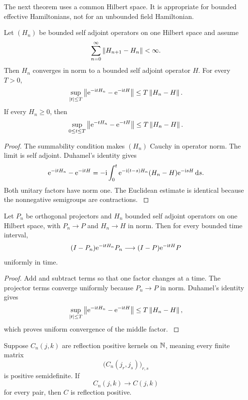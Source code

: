 The next theorem uses a common Hilbert space. It is appropriate for bounded effective Hamiltonians, not for an unbounded field Hamiltonian.

\begin{theorem}\label{strong:theorem:047}\label{strong:thm:norm_summable_tower}
Let \((H_n)\) be bounded self adjoint operators on one Hilbert space and assume
\[
\sum_{n=0}^{\infty}\left\lVert H_{n+1}-H_n\right\rVert<\infty.
\]
Then \(H_n\) converges in norm to a bounded self adjoint operator \(H\). For every \(T>0\),
\[
\sup_{\left\lvert t\right\rvert\leq T}
\left\lVert\mathrm e^{-\mathrm i tH_n}-\mathrm e^{-\mathrm i tH}\right\rVert
\leq
T\left\lVert H_n-H\right\rVert.
\]
If every \(H_n\geq0\), then
\[
\sup_{0\leq t\leq T}
\left\lVert\mathrm e^{-tH_n}-\mathrm e^{-tH}\right\rVert
\leq
T\left\lVert H_n-H\right\rVert.
\]
\end{theorem}

\begin{proof}\label{strong:proof:075}
The summability condition makes \((H_n)\) Cauchy in operator norm. The limit is self adjoint. Duhamel's identity gives
\[
\mathrm e^{-\mathrm i tH_n}-\mathrm e^{-\mathrm i tH}
=-\mathrm i\int_0^t
\mathrm e^{-\mathrm i(t-s)H_n}(H_n-H)\mathrm e^{-\mathrm i sH}\,\mathrm d s.
\]
Both unitary factors have norm one. The Euclidean estimate is identical because the nonnegative semigroups are contractions.
\label{strong:proof:075:end}\end{proof}

\begin{corollary}\label{strong:corollary:016}\label{strong:cor:limit_leakage}
Let \(P_n\) be orthogonal projectors and \(H_n\) bounded self adjoint operators on one Hilbert space, with \(P_n\to P\) and \(H_n\to H\) in norm. Then for every bounded time interval,
\[
(I-P_n)\mathrm e^{-\mathrm i tH_n}P_n
\longrightarrow
(I-P)\mathrm e^{-\mathrm i tH}P
\]
uniformly in time.
\end{corollary}

\begin{proof}\label{strong:proof:076}
Add and subtract terms so that one factor changes at a time. The projector terms converge uniformly because \(P_n\to P\) in norm. Duhamel's identity gives
\[
\sup_{\left\lvert t\right\rvert\leq T}
\left\lVert\mathrm e^{-\mathrm i tH_n}-\mathrm e^{-\mathrm i tH}\right\rVert
\leq
T\left\lVert H_n-H\right\rVert,
\]
which proves uniform convergence of the middle factor.
\label{strong:proof:076:end}\end{proof}

\begin{theorem}\label{strong:theorem:048}\label{strong:thm:reflection_limit}
Suppose \(C_n(j,k)\) are reflection positive kernels on \(\mathbb N\), meaning every finite matrix
\[
\bigl(C_n(j_r,j_s)\bigr)_{r,s}
\]
is positive semidefinite. If
\[
C_n(j,k)\longrightarrow C(j,k)
\]
for every pair, then \(C\) is reflection positive.
\end{theorem}

